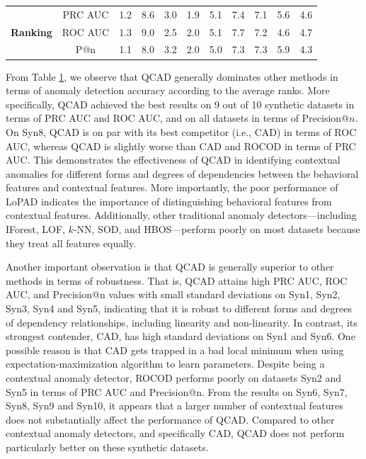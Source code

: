 \documentclass[pdflatex,sn-basic]{sn-jnl}%
\theoremstyle{thmstyleone}%
\theoremstyle{thmstyletwo}%
\theoremstyle{thmstylethree}%
\begin{document}
\begin{table}
\begin{tabular}{ccccccccccc}
		\multirow{3}{*}{\textbf{Ranking}\footnotemark[1]}  
		& PRC AUC 
		& 1.2 & 8.6 & 3.0 & 1.9 & 5.1 & 7.4 & 7.1 & 5.6 & 4.6\\
		&ROC AUC 
		& 1.3 & 9.0 & 2.5 & 2.0 & 5.1 & 7.7 & 7.2 & 4.6 & 4.7 \\
		&P@n 
		& 1.1 & 8.0 & 3.2 & 2.0 & 5.0 & 7.3 & 7.3 & 5.9 & 4.3\\
		\bottomrule
	\end{tabular}
	\label{tab:SynResults}

\end{table}

From Table \ref{tab:SynResults}, we observe that QCAD generally dominates other methods in terms of anomaly detection accuracy according to the average ranks. More specifically, QCAD achieved the best results on 9 out of 10 synthetic datasets in terms of PRC AUC and ROC AUC, and on all datasets in terms of Precision@$n$. On Syn8, QCAD is on par with its best competitor (i.e., CAD) in terms of ROC AUC, whereas QCAD is slightly worse than CAD and ROCOD in terms of PRC AUC. This demonstrates the effectiveness of QCAD in identifying contextual anomalies for different forms and degrees of dependencies between the behavioral features and contextual features. More importantly, the poor performance of LoPAD indicates the importance of distinguishing behavioral features from contextual features. Additionally, other traditional anomaly detectors---including IForest, LOF, $k$-NN, SOD, and HBOS---perform poorly on most datasets because they treat all features equally.

Another important observation is that QCAD is generally superior to other methods in terms of robustness. That is, QCAD attains high PRC AUC, ROC AUC, and Precision@n values with small standard deviations on Syn1, Syn2, Syn3, Syn4 and Syn5, indicating that it is robust to different forms and degrees of dependency relationships, including linearity and non-linearity. In contrast, its strongest contender, CAD, has high standard deviations on Syn1 and Syn6. One possible reason is that CAD gets trapped in a bad local minimum when using expectation-maximization algorithm to learn parameters. Despite being a contextual anomaly detector, ROCOD performs poorly on datasets Syn2 and Syn5 in terms of PRC AUC and Precision@n. From the results on Syn6, Syn7, Syn8, Syn9 and Syn10, it appears that a larger number of contextual features does not substantially affect the performance of QCAD. 
Compared to other contextual anomaly detectors, and specifically CAD, QCAD does not perform particularly better on these synthetic datasets.
\end{document}
